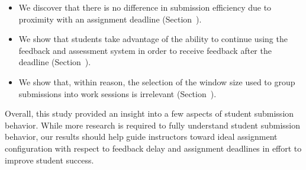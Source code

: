 \begin{itemize}
\item We discover that there is no difference in submission efficiency due to
  proximity with an assignment deadline (Section~).
\item We show that students take advantage of the ability to continue using the
  feedback and assessment system in order to receive feedback after the
  deadline (Section~).
\item We show that, within reason, the selection of the window size used to
  group submissions into work sessions is irrelevant
  (Section~).
\end{itemize}

Overall, this study provided an insight into a few aspects of student
submission behavior. While more research is required to fully understand
student submission behavior, our results should help guide instructors toward
ideal assignment configuration with respect to feedback delay and assignment
deadlines in effort to improve student success.
